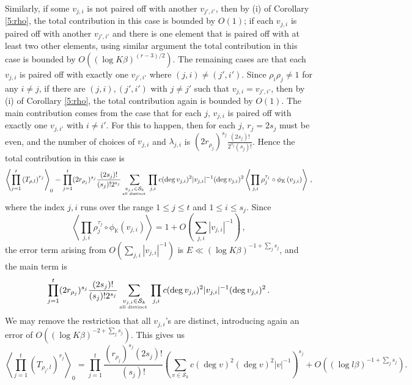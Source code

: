 \documentclass[12pt]{amsart}
\theoremstyle{plain}
\begin{document}
Similarly, if some $v_{j,i}$ is not paired off with another $v_{j',i'}$, then by (i) of Corollary \ref{5:rho}, the total contribution in this case is bounded by $O(1)$; if each $v_{j,i}$ is paired off with another $v_{j',i'}$ and there is one element that is paired off with at least two other elements, using similar argument the total contribution in this case is bounded by $O\left(\left(\log K\beta\right)^{(r-3)/2}\right)$. The remaining cases are that each $v_{j,i}$ is paired off with exactly one $v_{j',i'}$ where $(j,i) \ne (j',i')$. Since $\rho_i \rho_j \ne 1$ for any $i \ne j$, if there are $(j,i),(j',i')$ with $j \ne j'$ such that $v_{j,i}=v_{j',i'}$, then by (i) of Corollary \ref{5:rho}, the total contribution again is bounded by $O(1)$. The main contribution comes from the case that for each $j$, $v_{j,i}$ is paired off with exactly one $v_{j,i'}$ with $i \ne i'$. For this to happen, then for each $j$, $r_j=2s_j$ must be even, and the number of choices of $v_{j,i}$ and $\lambda_{j,i}$ is $(2 r_{\rho_j})^{s_j}\frac{(2s_j)!}{2^{s_j} (s_j)!}$. Hence the total contribution in this case is
\[\left\langle \prod_{j=1}^{t}\left(T_{\rho,l}\right)^{r_j} \right\rangle_0 = \prod_{j=1}^t (2 r_{\rho_j})^{s_j}\frac{(2s_j)!}{(s_j)! 2^{s_j}}\sum_{\substack{v_{j,i} \in {\mathcal{S}_k}
\\ \mbox{\tiny all distinct } }} \prod_{j,i} c(\deg v_{j,i})^2 |v_{j,i}|^{-1} (\deg v_{j,i})^2 \left\langle \prod_{j,i} \rho_j^{\tau_j} \circ {\phi_{{\mathbb K}}} \left(v_{j,i} \right) \right \rangle  \,, \]
where the index $j,i$ runs over the range $1 \le j \le t$ and $1 \le i \le s_j$. Since
\[\left\langle \prod_{j,i} \rho_j^{\tau_j} \circ {\phi_{{\mathbb K}}} \left(v_{j,i} \right) \right \rangle =1+ O\left(\sum_{j,i} |v_{j,i}|^{-1}\right)\,,  \]
the error term arising from $O\left(\sum_{j,i}|v_{j,i}|^{-1}\right)$ is $E \ll \left(\log K \beta\right)^{-1+\sum_{j}{s_j}}$, and the main term is
\[\prod_{j=1}^t (2r_{\rho_j})^{s_j}\frac{(2s_j)!}{(s_j)! 2^{s_j}}\sum_{\substack{v_{j,i} \in {\mathcal{S}_k} \\
\mbox{\tiny all distinct } }} \prod_{j,i} c(\deg v_{j,i})^2 |v_{j,i}|^{-1} (\deg v_{j,i})^2 \,. \]
We may remove the restriction that all $v_{j,i}$'s are distinct, introducing again an error of $O\left(\left(\log K \beta\right)^{-2+\sum_j s_j}\right)$. This gives us
\[\left\langle \prod_{j=1}^t\left(T_{\rho_j,l}\right)^{r_j} \right\rangle_0= \prod_{j=1}^t\frac{(r_{\rho_j})^{s_j}(2s_j)!}{(s_j)! } \left(\sum_{v \in {\mathcal{S}_k}} c(\deg v)^2 (\deg v)^2 |v|^{-1}\right)^{s_j} +O\left(\left(\log l \beta\right)^{-1+\sum_j s_j}\right).\]
\end{document}
